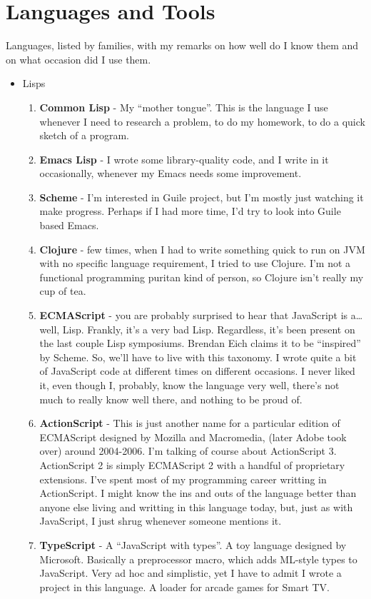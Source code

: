 \documentclass[oneside]{memoir}
\begin{document}
\chapter{Languages and Tools}
\label{sec-5}
Languages, listed by families, with my remarks on how well do I know them and
on what occasion did I use them.

\begin{itemize}
\item Lisps
\begin{enumerate}
\item \textbf{Common Lisp} - My ``mother tongue''.  This is the language I use whenever
I need to research a problem, to do my homework, to do a quick sketch of
a program.
\item \textbf{Emacs Lisp} - I wrote some library-quality code, and I write in it
occasionally, whenever my Emacs needs some improvement.
\item \textbf{Scheme} - I'm interested in Guile project, but I'm mostly just watching
it make progress.  Perhaps if I had more time, I'd try to look into Guile
based Emacs.
\item \textbf{Clojure} - few times, when I had to write something quick to run on JVM
with no specific language requirement, I tried to use Clojure.  I'm not a
functional programming puritan kind of person, so Clojure isn't really my
cup of tea.
\item \textbf{ECMAScript} - you are probably surprised to hear that JavaScript is a\ldots{}
well, Lisp.  Frankly, it's a very bad Lisp.  Regardless, it's been
present on the last couple Lisp symposiums.  Brendan Eich claims it to be
``inspired'' by Scheme.  So, we'll have to live with this taxonomy.  I
wrote quite a bit of JavaScript code at different times on different
occasions.  I never liked it, even though I, probably, know the language
very well, there's not much to really know well there, and nothing to be
proud of.
\item \textbf{ActionScript} - This is just another name for a particular edition of 
ECMAScript designed by Mozilla and Macromedia, (later Adobe took over)
around 2004-2006.  I'm talking of course about ActionScript 3.
ActionScript 2 is simply ECMAScript 2 with a handful of proprietary
extensions.  I've spent most of my programming career writting in
ActionScript.  I might know the ins and outs of the language better than
anyone else living and writting in this language today, but, just as
with JavaScript, I just shrug whenever someone mentions it.
\item \textbf{TypeScript} - A ``JavaScript with types''.  A toy language designed by
Microsoft.  Basically a preprocessor macro, which adds ML-style types
to JavaScript.  Very ad hoc and simplistic, yet I have to admit I wrote
a project in this language.  A loader for arcade games for Smart TV.
\end{enumerate}


\end{itemize}
\end{document}
